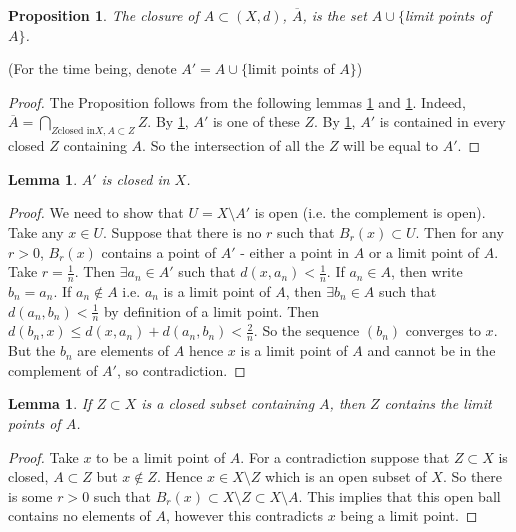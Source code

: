 \documentclass{article}
\theoremstyle{definition}
\theoremstyle{plain}%
\newtheorem{lem}[thm]{Lemma}
\newtheorem{prop}[thm]{Proposition}
\theoremstyle{remark}
\newcommand{\union}{\cup}
\begin{document}
\begin{prop}
The closure of $A \subset (X,d)$, $\overline{A}$, is the set $A \union \{$limit points of $A\}$.
\end{prop}


(For the time being, denote $A' = A \union \{$limit points of $A\}$)

\begin{proof}
The Proposition follows from the following lemmas \ref{lem a clos} and \ref{lem b clos}. Indeed, $\overline{A} = \bigcap_{Z \text{closed in} X, A \subset Z}Z$. By \ref{lem a clos}, $A'$ is one of these $Z$. By \ref{lem b clos}, $A'$ is contained in every closed $Z$ containing $A$. So the intersection of all the $Z$ will be equal to $A'$.
\end{proof}


\begin{lem}\label{lem a clos}
$A'$ is closed in $X$.
\end{lem}

\begin{proof}
We need to show that $U = X \setminus A'$ is open (i.e. the complement is open). Take any $x \in U$. Suppose that there is no $r$ such that $B_r(x) \subset U$. Then for any $r > 0$, $B_r(x)$ contains a point of $A'$ - either a point in $A$ or a limit point of $A$. Take $r = \frac{1}{n}$. Then $\exists a_n \in A'$ such that $d(x,a_n) < \frac{1}{n}$. If $a_n \in A$, then write $b_n = a_n$. If $a_n \not\in A$ i.e. $a_n$ is a limit point of $A$, then $\exists b_n \in A$ such that $d(a_n, b_n) < \frac{1}{n}$ by definition of a limit point. Then $d(b_n, x) \le d(x,a_n) + d(a_n, b_n) < \frac{2}{n}$. So the sequence $(b_n)$ converges to $x$. But the $b_n$ are elements of $A$ hence $x$ is a limit point of $A$ and cannot be in the complement of $A'$, so contradiction.
\end{proof}

\begin{lem}\label{lem b clos}
If $Z \subset X$ is a closed subset containing $A$, then $Z$ contains the limit points of $A$.
\end{lem}

\begin{proof}
Take $x$ to be a limit point of $A$. For a contradiction suppose that $Z \subset X$ is closed, $A \subset Z$ but $x \not\in Z$. Hence $x \in X \setminus Z$ which is an open subset of $X$. So there is some $r > 0$ such that $B_r(x) \subset X \setminus Z \subset X \setminus A$. This implies that this open ball contains no elements of $A$, however this contradicts $x$ being a limit point.
\end{proof}
\end{document}
